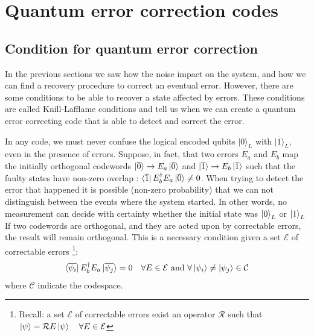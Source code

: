 \chapter{Quantum error correction codes}
\section{Condition for quantum error correction}
In the previous sections we saw how the noise impact on the system, and how we can find a recovery procedure to correct an eventual error. However, there are some conditions to be able to recover a state affected by errors. These conditions are called Knill-Lafflame conditions and tell us when we can create a quantum error correcting code that is able to detect and correct the error.



In any code, we must never confuse the logical encoded qubits $|\overline{0}\rangle_L$ with $|\overline{1}\rangle_L$, even in the presence of errors.
Suppose, in fact, that two errors $E_a$ and $E_b$ map the initially orthogonal codewords $\ket{\overline{0}} \to E_a\ket{\overline{0}}$ and $\ket{\overline{1}} \to E_b \ket{\overline{1}}$ such that the faulty states have non-zero overlap : $\bra{\overline{1}}E_b^{\dagger}E_a\ket{\overline{0}} \neq 0$. 
When trying to detect the error that happened it is possible (non-zero probability) that we can not distinguish between the events where the system started. In other words, no measurement can decide with certainty whether the initial state was $\ket{0}_L$ or $\ket{1}_L$
If two codewords are orthogonal, and they are acted upon by correctable errors, the result will remain orthogonal. This is a necessary condition given a set $\mathcal{E}$ of correctable errors \footnote{Recall: a set $\mathcal{E}$ of correctable errors exist an operator $\mathcal{R}$ such that $\ket{\psi} = \mathcal{R}E\ket{\psi} \quad \forall E \in \mathcal{E}$}:
\begin{equation*}
    \bra{\overline{\psi_i}}E_b^{\dagger}E_a\ket{\overline{\psi_j}} = 0 \quad \forall E \in \mathcal{E} \text{   and   } \forall \ket{\psi_i} \neq \ket{\psi_j} \in \mathcal{C}
\end{equation*}
where $\mathcal{C}$ indicate the codespace.

